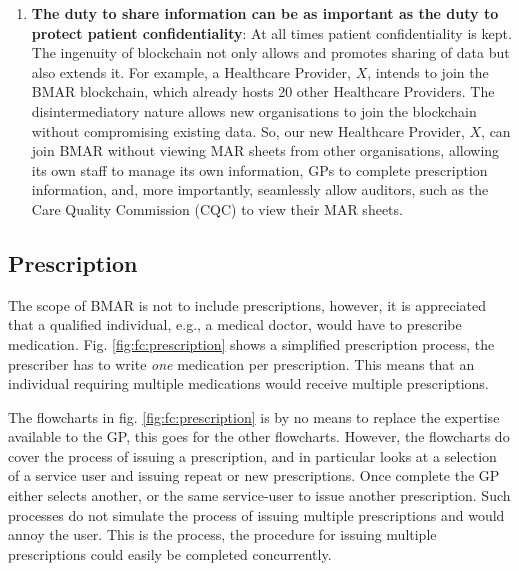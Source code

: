 \documentclass[runningheads]{llncs}
\begin{document}
\begin{enumerate}
	\item \textbf{ The duty to share information can be as important as the duty to protect patient confidentiality}: At all times patient confidentiality is kept. The ingenuity of blockchain not only allows and promotes sharing of data but also extends it. For example, a Healthcare Provider, $X$, intends to join the BMAR blockchain, which already hosts 20 other Healthcare Providers. The disintermediatory nature \cite{hyperledger:gaur2018} allows new organisations to join the blockchain without compromising existing data. So, our new Healthcare Provider, $X$, can join BMAR without viewing MAR sheets from other organisations, allowing its own staff to manage its own information, GPs to complete prescription information, and, more importantly, seamlessly allow auditors, such as the Care Quality Commission (CQC) to view their MAR sheets. 
\end{enumerate}


\subsection{Prescription}
The scope of BMAR is not to include prescriptions, however, it is appreciated that a qualified individual, e.g., a medical doctor, would have to prescribe medication. Fig. \ref{fig:fc:prescription} shows a simplified prescription process, the prescriber has to write {\em one} medication per prescription. This means that an individual requiring multiple medications would receive multiple prescriptions.

The flowcharts in fig. \ref{fig:fc:prescription} is by no means to replace the expertise available to the GP, this goes for the other flowcharts. However, the flowcharts do cover the process of issuing a prescription, and in particular looks at a selection of a service user and issuing repeat or new prescriptions. Once complete the GP either selects another, or the same service-user to issue another prescription. Such processes do not simulate the process of issuing multiple prescriptions and would annoy the user. This is the process, the procedure for issuing multiple prescriptions could easily be completed concurrently. 
\end{document}
